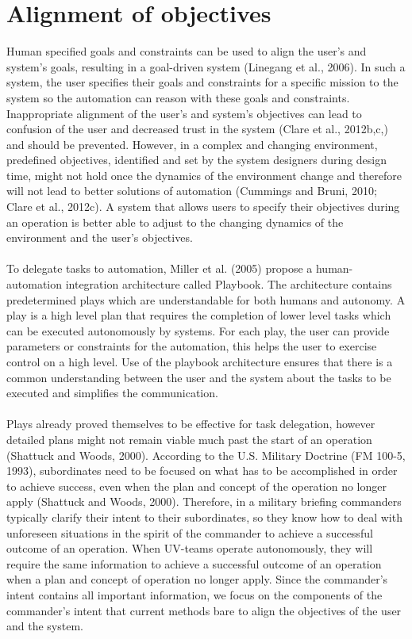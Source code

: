 \documentclass[twoside,twocolumn]{article}
\begin{document}
\section{Alignment of objectives}\label{sec:alignment}
Human specified goals and constraints can be used to align the user's and system's goals, resulting in a goal-driven system (Linegang et al., 2006). In such a system, the user specifies their goals and constraints for a specific mission to the system so the automation can reason with these goals and constraints. Inappropriate alignment of the user's and system's objectives can lead to confusion of the user and decreased trust in the system (Clare et al., 2012b,c,) and should be prevented. However, in a complex and changing environment, predefined objectives, identified and set by the system designers during design time, might not hold once the dynamics of the environment change and therefore will not lead to better solutions of automation (Cummings and Bruni, 2010; Clare et al., 2012c). A system that allows users to specify their objectives during an operation is better able to adjust to the changing dynamics of the environment and the user's objectives.
\\\\
To delegate tasks to automation, Miller et al. (2005) propose a human-automation integration architecture called Playbook. The architecture contains predetermined plays which are understandable for both humans and autonomy. A play is a high level plan that requires the completion of lower level tasks which can be executed autonomously by systems. For each play, the user can provide parameters or constraints for the automation, this helps the user to exercise control on a high level. Use of the playbook architecture ensures that there is a common understanding between the user and the system about the tasks to be executed and simplifies the communication. 
\\\\
Plays already proved themselves to be effective for task delegation, however detailed plans might not remain viable much past the start of an operation (Shattuck and Woods, 2000). According to the U.S. Military Doctrine (FM 100-5, 1993), subordinates need to be focused on what has to be accomplished in order to achieve success, even when the plan and concept of the operation no longer apply (Shattuck and Woods, 2000). Therefore, in a military briefing commanders typically clarify their intent to their subordinates, so they know how to deal with unforeseen situations in the spirit of the commander to achieve a successful outcome of an operation. When UV-teams operate autonomously, they will require the same information to achieve a successful outcome of an operation when a plan and concept of operation no longer apply. Since the commander's intent contains all important information, we focus on the components of the commander's intent that current methods bare to align the objectives of the user and the system.
\end{document}
